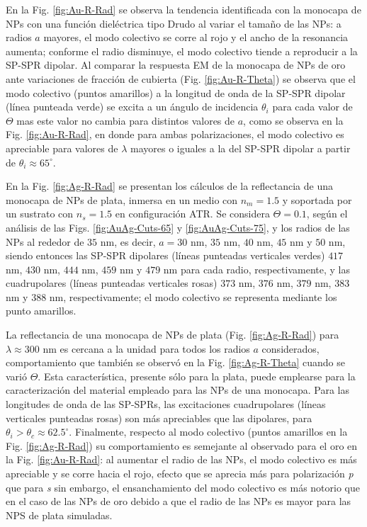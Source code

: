 En la Fig. \ref{fig:Au-R-Rad} se observa la tendencia identificada con la monocapa de NPs con una función dieléctrica tipo Drudo al variar el tamaño de las NPs: a radios $a$ mayores, el modo colectivo se corre al rojo y el ancho de la resonancia aumenta; conforme el radio disminuye, el modo colectivo tiende a reproducir a la SP-SPR dipolar. Al comparar la respuesta EM de la monocapa de NPs de oro ante variaciones de fracción de cubierta (Fig. \ref{fig:Au-R-Theta})  se observa que el modo colectivo (puntos amarillos) a la longitud de onda de la SP-SPR dipolar (línea punteada verde) se excita a un ángulo de incidencia $\theta_i$ para cada valor de $\Theta$ mas este valor no cambia para distintos valores de $a$, como se observa en la Fig. \ref{fig:Au-R-Rad}, en donde para ambas polarizaciones, el modo colectivo es apreciable para valores de $\lambda$ mayores o iguales a la del SP-SPR dipolar a partir de $\theta_i\approx 65^\circ$.

En la Fig. \ref{fig:Ag-R-Rad}	 se presentan los cálculos de la reflectancia de una monocapa de NPs  de plata, inmersa en un medio con $n_m=1.5$ y soportada por un sustrato con $n_s=1.5$ en configuración ATR. Se considera  $\Theta=0.1$,  según el análisis de las Figs. \ref{fig:AuAg-Cuts-65} y \ref{fig:AuAg-Cuts-75}, y los radios de las NPs al rededor de $35$ nm, es decir, $a=30$ nm, $35$ nm, $40$ nm, $45$ nm y $50$ nm, siendo entonces las SP-SPR dipolares (líneas punteadas verticales verdes) $417$ nm, $430$ nm, $444$ nm, $459$ nm y $479$ nm para cada radio, respectivamente, y las cuadrupolares (líneas punteadas verticales rosas) $373$ nm, $376$ nm, $379$ nm, $383$ nm y $388$ nm, respectivamente; el modo colectivo se representa mediante los punto amarillos.

La reflectancia de una monocapa de NPs de plata (Fig. \ref{fig:Ag-R-Rad}) para $\lambda\approx 300$ nm es cercana a la unidad para todos los radios $a$ considerados, comportamiento que también se observó en la Fig. \ref{fig:Ag-R-Theta} cuando se varió $\Theta$. Esta característica, presente sólo para la plata, puede emplearse para la caracterización del material empleado para las NPs de una monocapa. Para las longitudes de onda de las SP-SPRs, las excitaciones cuadrupolares (líneas verticales punteadas rosas) son más apreciables que las dipolares, para $\theta_i>\theta_c\approx 62.5^\circ$. Finalmente, respecto al  modo colectivo (puntos amarillos en la Fig. \ref{fig:Ag-R-Rad}) su comportamiento es semejante al observado para el oro en la Fig. \ref{fig:Au-R-Rad}: al aumentar el radio de las NPs, el modo colectivo es más apreciable y se corre hacia el rojo, efecto que se aprecia más para polarización \emph{p} que para \emph{s} sin embargo, el ensanchamiento del modo colectivo es más notorio que en el caso de las NPs de oro debido a que el radio de las NPs es mayor para las NPS de plata simuladas.

